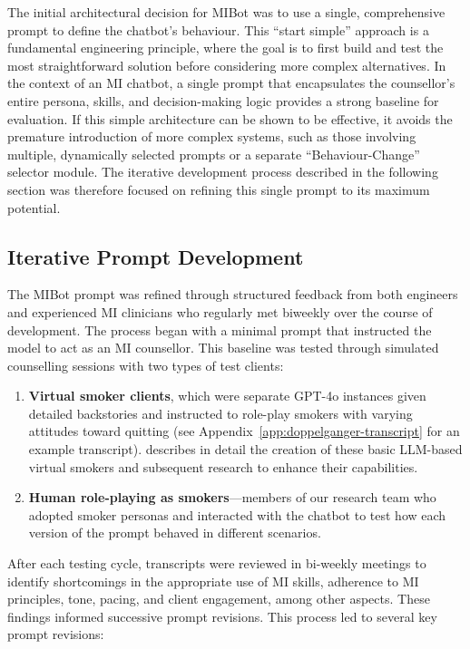 The initial architectural decision for MIBot was to use a single, comprehensive prompt to define the chatbot's behaviour. This ``start simple'' approach is a fundamental engineering principle, where the goal is to first build and test the most straightforward solution before considering more complex alternatives. In the context of an MI chatbot, a single prompt that encapsulates the counsellor's entire persona, skills, and decision-making logic provides a strong baseline for evaluation. If this simple architecture can be shown to be effective, it avoids the premature introduction of more complex systems, such as those involving multiple, dynamically selected prompts or a separate ``Behaviour-Change'' selector module. The iterative development process described in the following section was therefore focused on refining this single prompt to its maximum potential.

\subsection{Iterative Prompt Development}
The MIBot prompt was refined through structured feedback from both engineers and experienced MI clinicians who regularly met biweekly over the course of development. The process began with a minimal prompt that instructed the model to act as an MI counsellor. This baseline was tested through simulated counselling sessions with two types of test clients:

\begin{enumerate}
    \item \textbf{Virtual smoker clients}, which were separate GPT-4o instances given detailed backstories and instructed to role-play smokers with varying attitudes toward quitting (see Appendix~\ref{app:doppelganger-transcript} for an example transcript).  describes in detail the creation of these basic LLM-based virtual smokers and subsequent research to enhance their capabilities.
    \item \textbf{Human role-playing as smokers}---members of our research team who adopted smoker personas and interacted with the chatbot to test how each version of the prompt behaved in different scenarios.
\end{enumerate}

After each testing cycle, transcripts were reviewed in bi-weekly meetings to identify shortcomings in the appropriate use of MI skills, adherence to MI principles, tone, pacing, and client engagement, among other aspects. These findings informed successive prompt revisions. 
This process led to several key prompt revisions:


